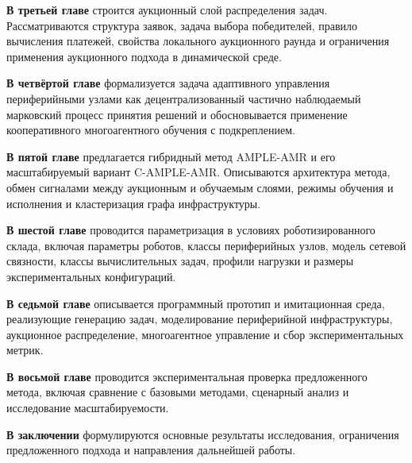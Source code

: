\textbf{В третьей главе} строится аукционный слой распределения задач.
Рассматриваются структура заявок, задача выбора победителей, правило вычисления платежей, свойства локального аукционного раунда и ограничения применения аукционного подхода в динамической среде.

\textbf{В четвёртой главе} формализуется задача адаптивного управления периферийными узлами как децентрализованный частично наблюдаемый марковский процесс принятия решений и обосновывается применение кооперативного многоагентного обучения с подкреплением.

\textbf{В пятой главе} предлагается гибридный метод AMPLE-AMR и его масштабируемый вариант C-AMPLE-AMR. Описываются архитектура метода, обмен сигналами между аукционным и обучаемым слоями, режимы обучения и исполнения и кластеризация графа инфраструктуры.

\textbf{В шестой главе} проводится параметризация в условиях роботизированного склада, включая параметры роботов, классы периферийных узлов, модель сетевой связности, классы вычислительных задач, профили нагрузки и размеры экспериментальных конфигураций.

\textbf{В седьмой главе} описывается программный прототип и имитационная среда, реализующие генерацию задач, моделирование периферийной инфраструктуры, аукционное распределение, многоагентное управление и сбор экспериментальных метрик.

\textbf{В восьмой главе} проводится экспериментальная проверка предложенного метода, включая сравнение с базовыми методами, сценарный анализ и исследование масштабируемости.

\textbf{В заключении} формулируются основные результаты исследования, ограничения предложенного подхода и направления дальнейшей работы.
